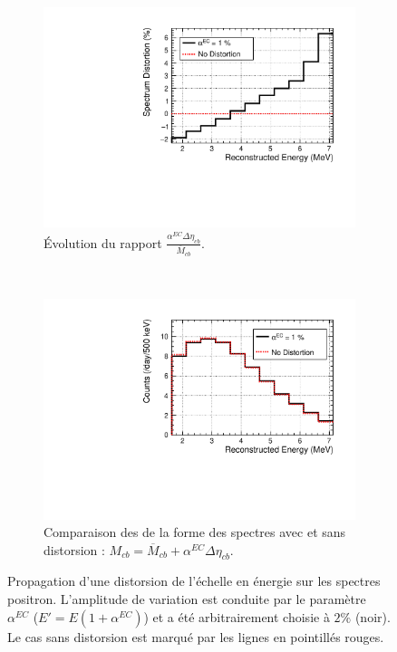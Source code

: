 {\begin{figure}[h!]
\centering
\begin{subfigure}[b]{0.49\textwidth}
\centering
\includegraphics[width=1\textwidth]{images/Escale_distortion_relat.pdf}
\caption{Évolution du rapport $\frac{\alpha^{EC}\Delta \eta_{cb}}{\overline{M}_{cb}}$.}
\label{fig:Escale_distortion_relat.pdf}
\end{subfigure}
~ %
\begin{subfigure}[b]{0.49\textwidth}
\centering
\includegraphics[width=1\textwidth]{images/Escale_distortion_abs.pdf}
\caption{Comparaison des de la forme des spectres avec et sans distorsion : $M_{cb} = \overline{M}_{cb} + \alpha^{EC}\Delta \eta_{cb}$.}
\label{fig:Escale_distortion_abs.pdf}
\end{subfigure}
\caption[Propagation d'une distorsion de l'échelle en énergie sur les spectres positron]{Propagation d'une distorsion de l'échelle en énergie sur les spectres positron. L'amplitude de variation est conduite par le paramètre $\alpha^{EC}$ ($E' = E(1+\alpha^{EC})$) et a été arbitrairement choisie à $2\%$ (noir). Le cas sans distorsion est marqué par les lignes en pointillés rouges.}
\label{fig:EScale_distortion_spectrum}
\end{figure}

}

